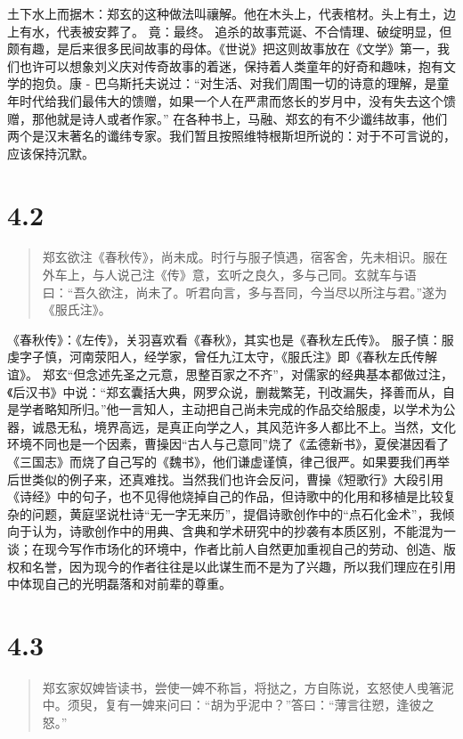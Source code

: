 \documentclass[]{book}
\begin{document}
土下水上而据木：郑玄的这种做法叫禳解。他在木头上，代表棺材。头上有土，边上有水，代表被安葬了。
竟：最终。
追杀的故事荒诞、不合情理、破绽明显，但颇有趣，是后来很多民间故事的母体。《世说》把这则故事放在《文学》第一，我们也许可以想象刘义庆对传奇故事的着迷，保持着人类童年的好奇和趣味，抱有文学的抱负。康
-
巴乌斯托夫说过：``对生活、对我们周围一切的诗意的理解，是童年时代给我们最伟大的馈赠，如果一个人在严肃而悠长的岁月中，没有失去这个馈赠，那他就是诗人或者作家。''
在各种书上，马融、郑玄的有不少谶纬故事，他们两个是汉末著名的谶纬专家。我们暂且按照维特根斯坦所说的：对于不可言说的，应该保持沉默。

\section{4.2}\label{section-182}

\begin{quote}
郑玄欲注《春秋传》，尚未成。时行与服子慎遇，宿客舍，先未相识。服在外车上，与人说己注《传》意，玄听之良久，多与己同。玄就车与语曰：``吾久欲注，尚未了。听君向言，多与吾同，今当尽以所注与君。''遂为《服氏注》。
\end{quote}

《春秋传》：《左传》，关羽喜欢看《春秋》，其实也是《春秋左氏传》。
服子慎：服虔字子慎，河南荥阳人，经学家，曾任九江太守，《服氏注》即《春秋左氏传解谊》。
郑玄``但念述先圣之元意，思整百家之不齐''，对儒家的经典基本都做过注，《后汉书》中说：``郑玄囊括大典，网罗众说，删裁繁芜，刊改漏失，择善而从，自是学者略知所归。''他一言知人，主动把自己尚未完成的作品交给服虔，以学术为公器，诚恳无私，境界高远，是真正向学之人，其风范许多人都比不上。当然，文化环境不同也是一个因素，曹操因``古人与己意同''烧了《孟德新书》，夏侯湛因看了《三国志》而烧了自己写的《魏书》，他们谦虚谨慎，律己很严。如果要我们再举后世类似的例子来，还真难找。当然我们也许会反问，曹操《短歌行》大段引用《诗经》中的句子，也不见得他烧掉自己的作品，但诗歌中的化用和移植是比较复杂的问题，黄庭坚说杜诗``无一字无来历''，提倡诗歌创作中的``点石化金术''，我倾向于认为，诗歌创作中的用典、含典和学术研究中的抄袭有本质区别，不能混为一谈；在现今写作市场化的环境中，作者比前人自然更加重视自己的劳动、创造、版权和名誉，因为现今的作者往往是以此谋生而不是为了兴趣，所以我们理应在引用中体现自己的光明磊落和对前辈的尊重。

\section{4.3}\label{section-183}

\begin{quote}
郑玄家奴婢皆读书，尝使一婢不称旨，将挞之，方自陈说，玄怒使人曵箸泥中。须臾，复有一婢来问曰：``胡为乎泥中？''答曰：``薄言往愬，逢彼之怒。''
\end{quote}
\end{document}
